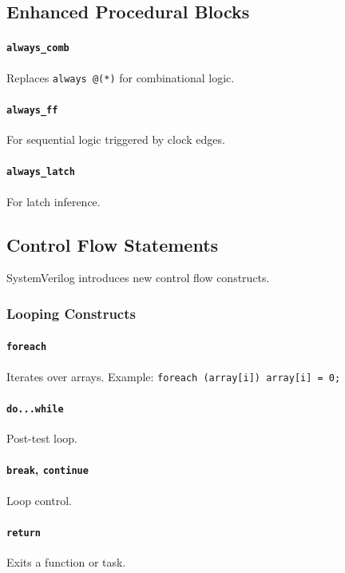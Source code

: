 \subsection{Enhanced Procedural Blocks}
\paragraph{\texttt{always\_comb}} Replaces \texttt{always @(*)} for combinational logic.

\paragraph{\texttt{always\_ff}} For sequential logic triggered by clock edges.

\paragraph{\texttt{always\_latch}} For latch inference.

\subsection{Control Flow Statements}
SystemVerilog introduces new control flow constructs.

\subsubsection{Looping Constructs}
\paragraph{\texttt{foreach}} Iterates over arrays. Example: \texttt{foreach (array[i]) array[i] = 0;}

\paragraph{\texttt{do...while}} Post-test loop.

\paragraph{\texttt{break}, \texttt{continue}} Loop control.

\paragraph{\texttt{return}} Exits a function or task.

